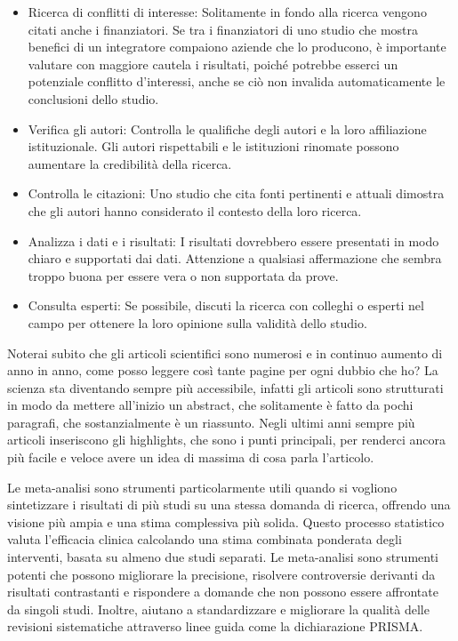 \documentclass[12pt]{book} %
\begin{document}
\begin{itemize}
\item Ricerca di conflitti di interesse: Solitamente in fondo alla ricerca vengono citati anche i finanziatori. Se tra i finanziatori di uno studio che mostra benefici di un integratore compaiono aziende che lo producono, è importante valutare con maggiore cautela i risultati, poiché potrebbe esserci un potenziale conflitto d’interessi, anche se ciò non invalida automaticamente le conclusioni dello studio.
\item Verifica gli autori: Controlla le qualifiche degli autori e la loro affiliazione istituzionale. Gli autori
rispettabili e le istituzioni rinomate possono aumentare la credibilità della ricerca.
\item Controlla le citazioni: Uno studio che cita fonti pertinenti e attuali dimostra che gli autori hanno considerato
il contesto della loro ricerca.
\item Analizza i dati e i risultati: I risultati dovrebbero essere presentati in modo chiaro e supportati dai dati.
Attenzione a qualsiasi affermazione che sembra troppo buona per essere vera o non supportata da prove.
\item Consulta esperti: Se possibile, discuti la ricerca con colleghi o esperti nel campo per ottenere la loro opinione
sulla validità dello studio.
\end{itemize}

\bigskip

Noterai subito che gli articoli scientifici sono numerosi e in continuo aumento di anno in anno, come posso leggere così
tante pagine per ogni dubbio che ho? La scienza sta diventando sempre più accessibile, infatti gli articoli sono
strutturati in modo da mettere all'inizio un abstract, che solitamente è fatto da pochi paragrafi,
che sostanzialmente è un riassunto. Negli ultimi anni sempre più articoli inseriscono gli highlights, che sono i punti
principali, per renderci ancora più facile e veloce avere un idea di massima di cosa parla
l'articolo.


\bigskip

Le meta-analisi sono strumenti particolarmente utili quando si vogliono sintetizzare i risultati di più studi su una stessa domanda di ricerca, offrendo una visione più ampia e una stima complessiva più solida. Questo processo statistico valuta
l'efficacia clinica calcolando una stima combinata ponderata degli interventi, basata su almeno
due studi separati. Le meta-analisi sono strumenti potenti che possono migliorare la precisione, risolvere controversie
derivanti da risultati contrastanti e rispondere a domande che non possono essere affrontate da singoli studi. Inoltre,
aiutano a standardizzare e migliorare la qualità delle revisioni sistematiche attraverso linee guida come la
dichiarazione PRISMA.
\end{document}
